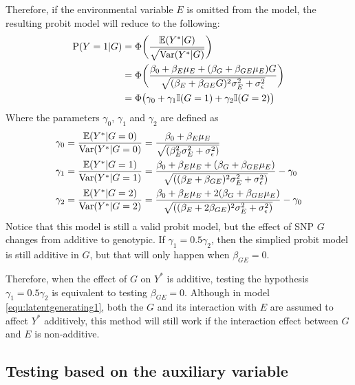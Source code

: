Therefore, if the environmental variable $E$ is omitted from the model, the resulting probit model will reduce to the following:
\begin{equation}\label{equ:simModelAdditive}
\begin{aligned}
\text{P}(Y=1|G) &= \Phi\bigg(\frac{\mathbb{E}(Y^*|G)}{\sqrt{\text{Var}(Y^*|G)}}\bigg)\\
                  &= \Phi\bigg(\frac{\beta_0+ \beta_E \mu_E + (\beta_G +\beta_{GE}\mu_E)G}{\sqrt{(\beta_E + \beta_{GE}G)^2 \sigma_E^2 + \sigma_\epsilon^2}}\bigg)\\
                  &= \Phi\big(\gamma_0 + \gamma_1 \mathbb{I}(G=1) + \gamma_2 \mathbb{I}(G=2) \big)
\end{aligned}
\end{equation}
Where the parameters $\gamma_0$, $\gamma_1$ and $\gamma_2$ are defined as
\begin{equation}\label{equ:gammDEF1}
\begin{aligned}
\gamma_0 &= \frac{\mathbb{E}(Y^*|G=0)}{\text{Var}(Y^*|G=0)} = \frac{\beta_0 + \beta_E \mu_E}{\sqrt{(\beta_E^2 \sigma_E^2 + \sigma_\epsilon^2)}} \\
\gamma_1 &= \frac{\mathbb{E}(Y^*|G=1)}{\text{Var}(Y^*|G=1)} = \frac{\beta_0 + \beta_E \mu_E + (\beta_G+\beta_{GE}\mu_E)}{\sqrt{((\beta_E + \beta_{GE})^2 \sigma_E^2 + \sigma_\epsilon^2)}} - \gamma_0 \\
\gamma_2 &= \frac{\mathbb{E}(Y^*|G=2)}{\text{Var}(Y^*|G=2)} = \frac{\beta_0 + \beta_E \mu_E + 2(\beta_G+\beta_{GE}\mu_E)}{\sqrt{((\beta_E + 2\beta_{GE})^2 \sigma_E^2 + \sigma_\epsilon^2)}} - \gamma_0 \\
\end{aligned}
\end{equation}
Notice that this model is still a valid probit model, but the effect of SNP $G$ changes from additive to genotypic. If $\gamma_1 = 0.5 \gamma_2$, then the simplied probit model is still additive in $G$, but that will only happen when $\beta_{GE} = 0$.

Therefore, when the effect of $G$ on $Y^*$ is additive, testing the hypothesis $\gamma_1 = 0.5 \gamma_2$ is equivalent to testing $\beta_{GE} = 0$. Although in model \ref{equ:latentgenerating1}, both the $G$ and its interaction with $E$ are assumed to affect $Y^*$ additively, this method will still work if the interaction effect between $G$ and $E$ is non-additive.

\subsection{Testing based on the auxiliary variable}

